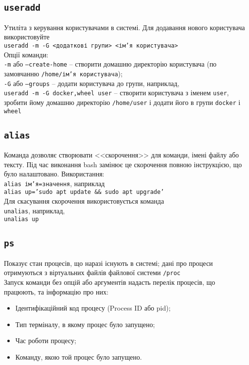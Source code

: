 \documentclass[10pt,a4paper]{fancyhandout}
\begin{document}
\subsection{\texttt{useradd}}
Утиліта з керування користувачами в системі. Для додавання нового користувача використовуйте \\
\texttt{useradd -m -G <додаткові групи> <ім'я користувача>} \\
Опції команди: \\
\texttt{-m} або \texttt{--create-home} -- створити домашню директорію користувача (по замовчанню \texttt{/home/ім'я користувача}); \\
\texttt{-G} або \texttt{--groups} -- додати користувача до групи, наприклад, \\
\texttt{useradd -m -G docker,wheel user} -- створити користувача з іменем \texttt{user}, зробити йому домашню директорію \texttt{/home/user} і додати його в групи \texttt{docker} і \texttt{wheel} \\
\goodbreak

\subsection{\texttt{alias}}
Команда дозволяє створювати <<скорочення>> для команди, імені файлу або тексту. Під час виконання bash замінює це скорочення повною інструкцією, що було налаштовано. Використання: \\
\texttt{alias ім'я=значення}, наприклад \\
\texttt{alias up='sudo apt update \&\& sudo apt upgrade'} \\
Для скасування скорочення використовується команда \\
\texttt{unalias}, наприклад, \\
\texttt{unalias up}
\goodbreak

\subsection{\texttt{ps}}
Показує стан процесів, що наразі існують в системі; дані про процеси отримуються з віртуальних файлів файлової системи \texttt{/proc} \\
Запуск команди без опцій або аргументів надасть перелік процесів, що працюють, та інформацію про них: \\
\begin{itemize}
	\item Ідентифікаційний код процесу (Process ID або pid);
	\item Тип терміналу, в якому процес було запущено;
	\item Час роботи процесу;
	\item Команду, якою той процес було запущено.
\end{itemize}
\goodbreak
\end{document}
